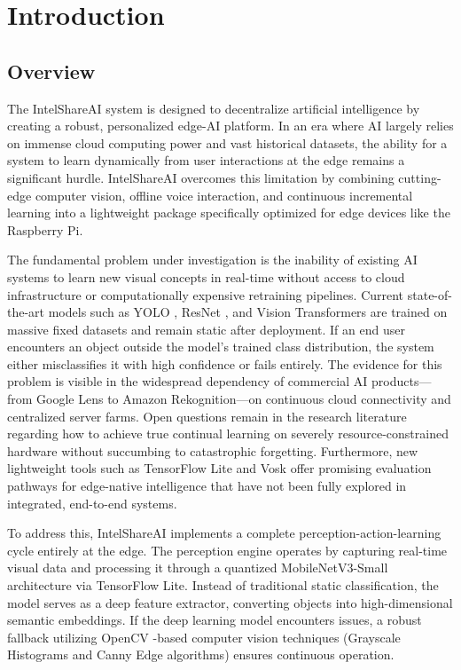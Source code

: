 \documentclass[12pt,a4paper]{report}
\begin{document}
\chapter{Introduction}

\section{Overview}
The IntelShareAI system is designed to decentralize artificial intelligence by creating a robust, personalized edge-AI platform. In an era where AI largely relies on immense cloud computing power and vast historical datasets, the ability for a system to learn dynamically from user interactions at the edge remains a significant hurdle. IntelShareAI overcomes this limitation by combining cutting-edge computer vision, offline voice interaction, and continuous incremental learning into a lightweight package specifically optimized for edge devices like the Raspberry Pi.

The fundamental problem under investigation is the inability of existing AI systems to learn new visual concepts in real-time without access to cloud infrastructure or computationally expensive retraining pipelines. Current state-of-the-art models such as YOLO \cite{yolo}, ResNet \cite{resnet}, and Vision Transformers \cite{vit} are trained on massive fixed datasets and remain static after deployment. If an end user encounters an object outside the model's trained class distribution, the system either misclassifies it with high confidence or fails entirely. The evidence for this problem is visible in the widespread dependency of commercial AI products---from Google Lens to Amazon Rekognition---on continuous cloud connectivity and centralized server farms. Open questions remain in the research literature regarding how to achieve true continual learning on severely resource-constrained hardware without succumbing to catastrophic forgetting. Furthermore, new lightweight tools such as TensorFlow Lite and Vosk \cite{vosk} offer promising evaluation pathways for edge-native intelligence that have not been fully explored in integrated, end-to-end systems.

To address this, IntelShareAI implements a complete perception-action-learning cycle entirely at the edge. The perception engine operates by capturing real-time visual data and processing it through a quantized MobileNetV3-Small architecture \cite{howard2019} via TensorFlow Lite. Instead of traditional static classification, the model serves as a deep feature extractor, converting objects into high-dimensional semantic embeddings. If the deep learning model encounters issues, a robust fallback utilizing OpenCV \cite{opencv}-based computer vision techniques (Grayscale Histograms and Canny Edge algorithms) ensures continuous operation.
\end{document}
